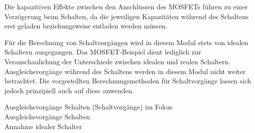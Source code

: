 \begin{frame}
{	%
	Die kapazitiven Effekte zwischen den Anschlüssen des MOSFETs führen zu einer Verzögerung beim Schalten,
	da die jeweiligen Kapazitäten während des Schaltens erst geladen beziehungsweise entladen werden müssen.
	
	Für die Berechnung von Schaltvorgängen wird in diesem Modul stets von idealen Schaltern ausgegangen.
	Das MOSFET-Beispiel dient lediglich zur Veranschaulichung der Unterschiede zwischen idealen und realen Schaltern.
	Ausgleichsvorgänge während des Schaltens werden in diesem Modul nicht weiter betrachtet. 
	Die vorgestellten Berechnungsmethoden für Schaltvorgänge lassen sich jedoch prinzipiell 
	auch auf diese anwenden.
}%
\b{%
	 Ausgleichsvorgänge  Schalten (Schaltvorgänge) im Fokus
	\\[+4pt]%
	 Ausgleichsvorgänge  Schalten
	\\[+4pt]%
	 Annahme idealer Schalter 
}
\end{frame}



